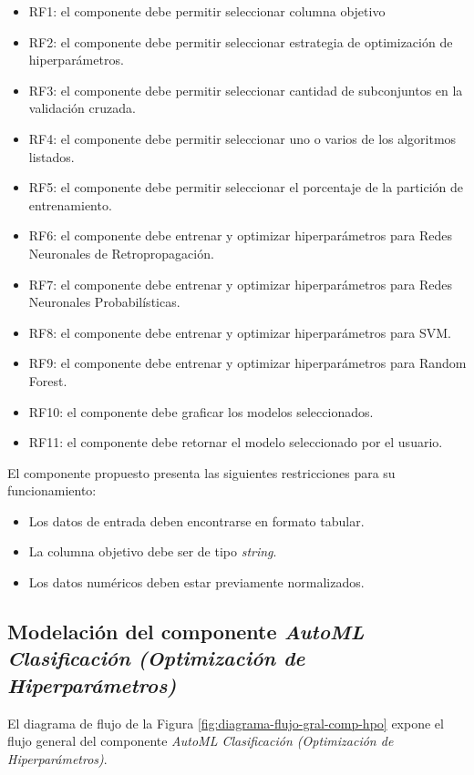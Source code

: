 \begin{itemize}
	\item RF1: el componente debe permitir seleccionar columna objetivo
	\item RF2: el componente debe permitir seleccionar estrategia de optimización de hiperparámetros.
	\item RF3: el componente debe permitir seleccionar cantidad de subconjuntos en la validación cruzada.
	\item RF4: el componente debe permitir seleccionar uno o varios de los algoritmos listados.
	\item RF5: el componente debe permitir seleccionar el porcentaje de la partición de entrenamiento.
	\item RF6: el componente debe entrenar y optimizar hiperparámetros para Redes Neuronales de Retropropagación. 
	\item RF7: el componente debe entrenar y optimizar hiperparámetros para Redes Neuronales Probabilísticas. 
	\item RF8: el componente debe entrenar y optimizar hiperparámetros para SVM.
	\item RF9: el componente debe entrenar y optimizar hiperparámetros para Random Forest.
	\item RF10: el componente debe graficar los modelos seleccionados.
	\item RF11: el componente debe retornar el modelo seleccionado por el usuario.
\end{itemize}

El componente propuesto presenta las siguientes restricciones para su funcionamiento:

\begin{itemize}
	\item Los datos de entrada deben encontrarse en formato tabular.
	\item La columna objetivo debe ser de tipo \textit{string}.
	\item Los datos numéricos deben estar previamente normalizados.
\end{itemize}

\subsection{Modelación del componente \textit{AutoML Clasificación (Optimización de Hiperparámetros)}}
El diagrama de flujo de la Figura \ref{fig:diagrama-flujo-gral-comp-hpo} expone el flujo general del componente \textit{AutoML Clasificación (Optimización de Hiperparámetros)}.

